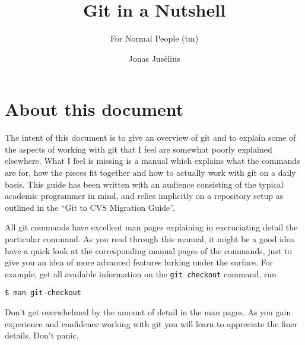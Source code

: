 \documentclass[a4paper,10pt]{article}
\begin{document}
\pagestyle{fancy}
\fancyfoot{}
\fancyhead{}
\renewcommand{\sectionmark}[1]{\markboth{\sf\thesection.\ #1}{}}
\renewcommand{\subsectionmark}[1]{}
\fancyhead[R]{{\rmfamily\thepage}}
\newcommand{\Ref}[1]{section~\ref{#1}, p.~\pageref{#1}}

\title{Git in a Nutshell}

\subtitle{For Normal People (tm)}
\author{{\sf Jonas Jus\'elius}}
\address{
{\tt <jonas.juselius@chem.uit.no>}\\
{\sf Centre for Theoretical and Computational Chemistry}\\
{\sf University of Tromsø}\\
{\sf N-9037 University of Tromsø, Norway}
}


\maketitle
\tableofcontents
\newpage

\section*{About this document}
The intent of this document is to give an overview of git and to explain some of
the aspects of working with git that I feel are somewhat poorly explained
elsewhere. 
What I feel is missing is a manual which explains what the commands are for,
how the pieces fit together and how to actually work with git on a daily
basis. This guide has been written with an audience consisting of the typical
academic programmer in mind, and relies implicitly on a repository setup as
outlined in the ``Git to CVS Migration Guide''.

All git commands have excellent man pages explaining in
excruciating detail the particular command. As you read through this manual,
it might be a good idea have a quick look at the corresponding manual pages of
the commands, just to give you an idea of more advanced features lurking under
the surface. For example, get all available information on the
\texttt{git checkout} command, run
\begin{verbatim}
$ man git-checkout
\end{verbatim}
Don't get overwhelmed by the amount of detail in the man pages. As
you gain experience and confidence working with git you will learn to
appreciate the finer details. Don't panic.
\end{document}
